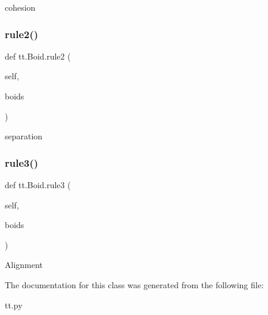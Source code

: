 \begin{DoxyVerb}cohesion\end{DoxyVerb}
 \mbox{\label{classtt_1_1_boid_a30d518c7257d2251b0cb51c23015209d}} 
\subsubsection{\texorpdfstring{rule2()}{rule2()}}
{\footnotesize\ttfamily def tt.\+Boid.\+rule2 (\begin{DoxyParamCaption}\item[{}]{self,  }\item[{}]{boids }\end{DoxyParamCaption})}

\begin{DoxyVerb}separation\end{DoxyVerb}
 \mbox{\label{classtt_1_1_boid_abe009e8c75ccd8f9f01227c28258c463}} 
\subsubsection{\texorpdfstring{rule3()}{rule3()}}
{\footnotesize\ttfamily def tt.\+Boid.\+rule3 (\begin{DoxyParamCaption}\item[{}]{self,  }\item[{}]{boids }\end{DoxyParamCaption})}

\begin{DoxyVerb}Alignment\end{DoxyVerb}
 

The documentation for this class was generated from the following file\+:\begin{DoxyCompactItemize}
\item 
tt.\+py\end{DoxyCompactItemize}
